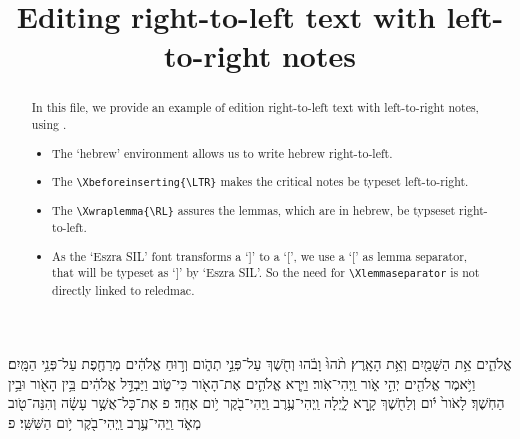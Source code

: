 \documentclass[12pt]{article}
\title{Editing right-to-left text with left-to-right notes}
\date{}
\begin{document}
\maketitle
\begin{abstract}


In this file, we provide an example of edition right-to-left text with left-to-right notes, using \XeLaTeX.

\begin{itemize}
	\item The `hebrew' environment allows us to write hebrew right-to-left.
	\item The \verb+\Xbeforeinserting{\LTR}+  makes the critical notes be typeset left-to-right.
	\item The \verb+\Xwraplemma{\RL}+ assures the lemmas, which are in hebrew, be typseset right-to-left.
	\item As the `Eszra SIL' font transforms a `]' to a `[', we use a `[' as lemma separator, that will be typeset as `]' by `Eszra SIL'. So the need for \verb+\Xlemmaseparator+ is not directly linked to reledmac.
\end{itemize}

\end{abstract}

\begin{hebrew}
\beginnumbering


\pstart
{} 
אֱלֹהִ֑ים אֵ֥ת הַשָּׁמַ֖יִם וְאֵ֥ת הָאָֽרֶץ׃
 תֹ֨הוּ֙ וָבֹ֔הוּ וְחֹ֖שֶׁךְ עַל־פְּנֵ֣י תְהֹ֑ום וְר֣וּחַ אֱלֹהִ֔ים מְרַחֶ֖פֶת עַל־פְּנֵ֥י הַמָּֽיִם׃
וַיֹּ֥אמֶר אֱלֹהִ֖ים יְהִ֣י אֹ֑ור וַֽיְהִי־אֹֽור׃
וַיַּ֧רְא אֱלֹהִ֛ים אֶת־הָאֹ֖ור כִּי־טֹ֑וב וַיַּבְדֵּ֣ל אֱלֹהִ֔ים בֵּ֥ין הָאֹ֖ור וּבֵ֥ין הַחֹֽשֶׁךְ׃
 לָאֹור֙ יֹ֔ום וְלַחֹ֖שֶׁךְ קָ֣רָא לָ֑יְלָה וַֽיְהִי־עֶ֥רֶב וַֽיְהִי־בֹ֖קֶר יֹ֥ום אֶחָֽד׃ פ
 אֶת־כָּל־אֲשֶׁ֣ר עָשָׂ֔ה וְהִנֵּה־טֹ֖וב מְאֹ֑ד וַֽיְהִי־עֶ֥רֶב וַֽיְהִי־בֹ֖קֶר יֹ֥ום הַשִּׁשִּֽׁי׃ פ

\pend
\endnumbering

\end{hebrew}
\end{document}
